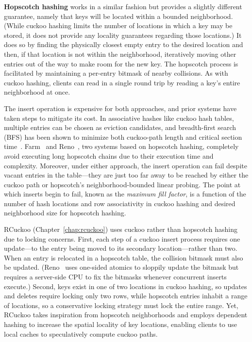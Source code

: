 \documentclass[12pt]{ucsddissertation}
\begin{document}
\textbf{Hopscotch hashing} works in a similar fashion but provides a slightly different guarantee,
namely that keys will be located within a bounded neighborhood. (While cuckoo hashing limits the
number of locations in which a key may be stored, it does not provide any locality guarantees
regarding those locations.) It does so by finding the physically closest empty entry to the desired
location and then, if that location is not within the neighborhood, iteratively moving other entries
out of the way to make room for the new key. The hopscotch process is facilitated by maintaining a
per-entry bitmask of nearby collisions. As with cuckoo hashing, clients can read in a single round
trip by reading a key’s entire neighborhood at once.

The insert operation is expensive for both approaches, and prior systems have taken steps to
mitigate its cost. In associative hashes like cuckoo hash tables, multiple entries can be chosen as
eviction candidates, and breadth-first search (BFS) has been shown to minimize both cuckoo-path
length and critical section time~\cite{memc3,cuckoo-improvements}. Farm~\cite{farm} and
Reno~\cite{reno}, two systems based on hopscotch hashing, completely avoid executing long hopscotch
chains due to their execution time and complexity. Moreover, under either approach, the insert
operation can fail despite vacant entries in the table—they are just too far away to be reached by
either the cuckoo path or hopscotch’s neighborhood-bounded linear probing. The point at which
inserts begin to fail, known as the \emph{maximum fill factor}, is a function of the number of hash
locations and row associativity in cuckoo hashing and desired neighborhood size for hopscotch
hashing.


RCuckoo (Chapter~\ref{chap:rcuckoo}) uses cuckoo rather than hopscotch hashing due to locking
concerns. First, each step of a cuckoo insert process requires one update—to the entry being moved
to its secondary location—rather than two. When an entry is relocated in a hopscotch table, the
collision bitmask must also be updated. (Reno~\cite{reno} uses one-sided atomics to sloppily update
the bitmask but requires a server-side CPU to fix the bitmasks whenever concurrent inserts execute.)
Second, keys exist in one of two locations in cuckoo hashing, so updates and deletes require locking
only two rows, while hopscotch entries inhabit a range of locations, so a conservative locking
strategy must lock the entire range. Yet, RCuckoo takes inspiration from hopscotch neighborhoods and
employs dependent hashing to increase the spatial locality of key locations, enabling clients to use
local caches to speculatively compute cuckoo paths.
\end{document}
